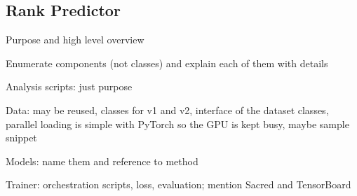 \subsection{Rank Predictor}

Purpose and high level overview

Enumerate components (not classes) and explain each of them with details

Analysis scripts: just purpose

Data: may be reused, classes for v1 and v2, interface of the dataset classes, parallel loading is simple with PyTorch so the GPU is kept busy, maybe sample snippet

Models: name them and reference to method

Trainer: orchestration scripts, loss, evaluation; mention Sacred and TensorBoard

